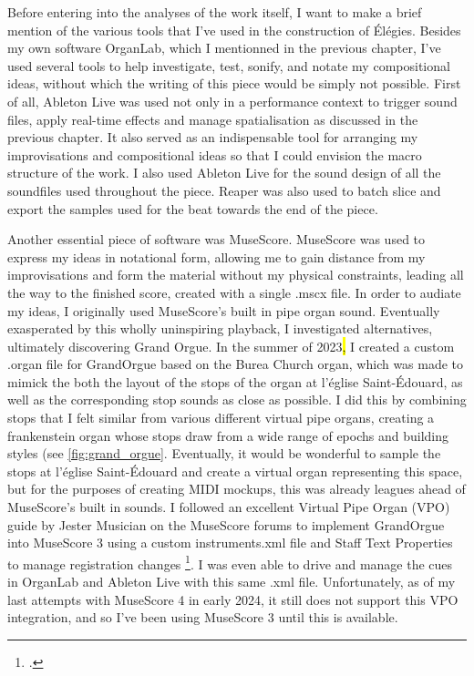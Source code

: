 \documentclass[12pt,twoside,maitrise]{dms_ks}
\theoremstyle{definition}
\begin{document}
{Before entering into the analyses of the work itself, I want to make a brief mention of the various tools that I've used in the construction of Élégies. 
Besides my own software OrganLab, which I mentionned in the previous chapter, I've used several tools to help investigate, test, sonify, and notate my compositional ideas, without which the writing of this piece would be simply not possible. 
First of all, Ableton Live was used not only in a performance context to trigger sound files, apply real-time effects and manage spatialisation as discussed in the previous chapter. 
It also served as an indispensable tool for arranging my improvisations and compositional ideas so that I could envision the macro structure of the work. 
I also used Ableton Live for the sound design of all the soundfiles used throughout the piece. 
Reaper was also used to batch slice and export the samples used for the beat towards the end of the piece.

Another essential piece of software was MuseScore. 
MuseScore was used to express my ideas in notational form, allowing me to gain distance from my improvisations and form the material without my physical constraints, leading all the way to the finished score, created with a single .mscx file. 
In order to audiate my ideas, I originally used MuseScore's built in pipe organ sound. 
Eventually exasperated by this wholly uninspiring playback, I investigated alternatives, ultimately discovering Grand Orgue. 
In the summer of 2023\hl{,} I created a custom .organ file for GrandOrgue based on the Burea Church organ, which was made to mimick the both the layout of the stops of the organ at l'église Saint-Édouard, as well as the corresponding stop sounds as close as possible. 
I did this by combining stops that I felt similar from various different virtual pipe organs, creating a frankenstein organ whose stops draw from a wide range of epochs and building styles (see \cref{fig:grand_orgue}. 
Eventually, it would be wonderful to sample the stops at l'église Saint-Édouard and create a virtual organ representing this space, but for the purposes of creating MIDI mockups, this was already leagues ahead of MuseScore's built in sounds. 
I followed an excellent Virtual Pipe Organ (VPO) guide by Jester Musician on the MuseScore forums to implement GrandOrgue into MuseScore 3 using a custom instruments.xml file and Staff Text Properties to manage registration changes \footcite{musician_jester_how_2018}. 
I was even able to drive and manage the cues in OrganLab and Ableton Live with this same .xml file. 
Unfortunately, as of my last attempts with MuseScore 4 in early 2024, it still does not support this VPO integration, and so I've been using MuseScore 3 until this is available.

}
\end{document}
